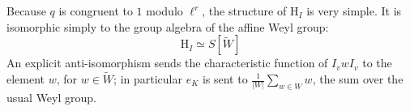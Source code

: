 \documentclass[10pt]{amsart}
\newcommand{\Hom}{\mathrm{Hom}}
\theoremstyle{remark}
\begin{document}

 
%
%
%
%
%
%
%
%
%
 
Because $q$ is congruent to $1$ modulo $\ell^r$, the structure of $\mathrm{H}_I$ is very simple.
 It is isomorphic simply to the group algebra 
 of the affine Weyl group:
 \begin{equation} \label{affineweyl} \mathrm{H}_I \simeq S[\tilde{W}] \end{equation}
An explicit anti-isomorphism sends the characteristic function of $I_v w I_v$ to the
 element $w$, for $w \in \tilde{W}$; in particular $e_K$ is sent
 to $\frac{1}{|W|} \sum_{w \in W} w$, the sum over the usual Weyl group. 
 
\end{document}
